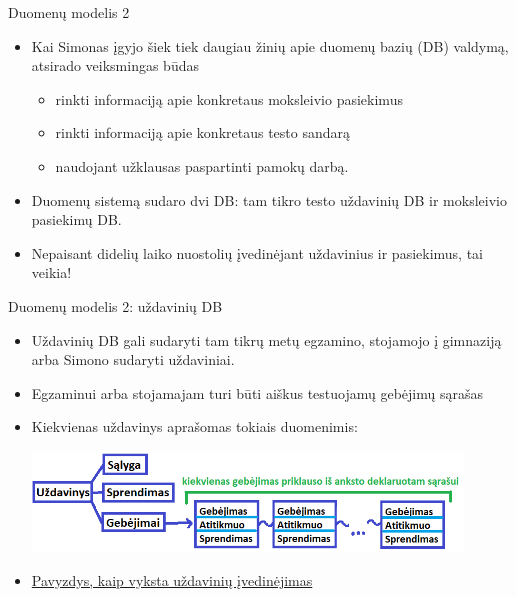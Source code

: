 \documentclass[xcolor={dvipsnames}]{beamer}
\begin{document}
\begin{frame}[fragile]{Duomenų modelis 2}
\begin{itemize}
\item<1-> Kai Simonas įgyjo šiek tiek daugiau žinių apie duomenų bazių (DB) valdymą, atsirado veiksmingas būdas
\begin{itemize}
\item<2-> rinkti informaciją apie konkretaus moksleivio pasiekimus
\item<3-> rinkti informaciją apie konkretaus testo sandarą
\item<4-> naudojant užklausas paspartinti pamokų darbą.
\end{itemize}
\item<5-> Duomenų sistemą sudaro dvi DB: tam tikro testo uždavinių DB ir moksleivio pasiekimų DB.
\item<6-> Nepaisant didelių laiko nuostolių įvedinėjant uždavinius ir pasiekimus, tai veikia!
\end{itemize}
\end{frame}

\begin{frame}[fragile]{Duomenų modelis 2: uždavinių DB}
\begin{itemize}
\item<1-> Uždavinių DB gali sudaryti tam tikrų metų egzamino, stojamojo į gimnaziją arba Simono sudaryti uždaviniai.
\item<2-> Egzaminui arba stojamajam turi būti aiškus testuojamų gebėjimų sąrašas
\item<3-> Kiekvienas uždavinys aprašomas tokiais duomenimis:

\includegraphics[width=0.9\textwidth]{problem_db.png}

\item<4-> \href{https://github.com/loijord/matematikos\_pamokos/blob/master/programa/database/generavimas/licejus\_2017.ipynb}{Pavyzdys, kaip vyksta uždavinių įvedinėjimas}
\end{itemize}
\end{frame}
\end{document}
